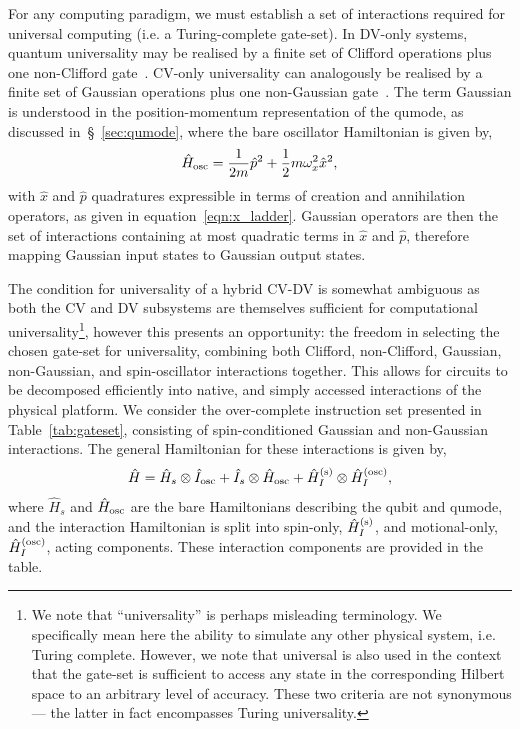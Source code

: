     For any computing paradigm, we must establish a set of interactions required for universal computing (i.e. a Turing-complete gate-set). In DV-only systems, quantum universality may be realised by a finite set of Clifford operations plus one non-Clifford gate~\cite{nielsen_quantum_2010, aaronson_improved_2004}. CV-only universality can analogously be realised by a finite set of Gaussian operations plus one non-Gaussian gate~\cite{braunstein_quantum_2005,lloyd_quantum_1999}.
    The term Gaussian is understood in the position-momentum representation of the qumode, as discussed in~\S~\ref{sec:qumode}, where the bare oscillator Hamiltonian is given by,
    \begin{equation}
        \hat H_{\rm osc} = \frac{1}{2m}\hat p^2 + \frac{1}{2}m\omega_x^2\hat x^2,
    \end{equation}
    with $\hat x$ and $\hat p$ quadratures expressible in terms of creation and annihilation operators, as given in equation~\ref{eqn:x_ladder}.
    Gaussian operators are then the set of interactions containing at most quadratic terms in $\hat x$ and $\hat p$, therefore mapping Gaussian input states to Gaussian output states. 

    The condition for universality of a hybrid CV-DV is somewhat ambiguous as both the CV and DV subsystems are themselves sufficient for computational universality\footnote{We note that ``universality'' is perhaps misleading terminology. We specifically mean here the ability to simulate any other physical system, i.e. Turing complete. However, we note that universal is also used in the context that the gate-set is sufficient to access any state in the corresponding Hilbert space to an arbitrary level of accuracy. These two criteria are not synonymous --- the latter in fact encompasses Turing universality.}, however this presents an opportunity: the freedom in selecting the chosen gate-set for universality, combining both Clifford, non-Clifford, Gaussian, non-Gaussian, and spin-oscillator interactions together. This allows for circuits to be decomposed efficiently into native, and simply accessed interactions of the physical platform. 
    We consider the over-complete instruction set presented in Table~\ref{tab:gateset}, consisting of spin-conditioned Gaussian and non-Gaussian interactions. The general Hamiltonian for these interactions is given by,
    \begin{equation}
        \hat H = \hat H_s\otimes \hat I_{\rm osc} + \hat I_s\otimes \hat H_{\rm osc} + \hat H_I^{\rm (s)}\otimes\hat H_I^{\rm (osc)},
    \end{equation} 
    where $\hat H_s$ and $\hat H_{\rm osc}$ are the bare Hamiltonians describing the qubit and qumode, and the interaction Hamiltonian is split into spin-only, $\hat H_I^{\rm (s)}$, and motional-only, $\hat H_I^{\rm (osc)}$, acting components. These interaction components are provided in the table.

